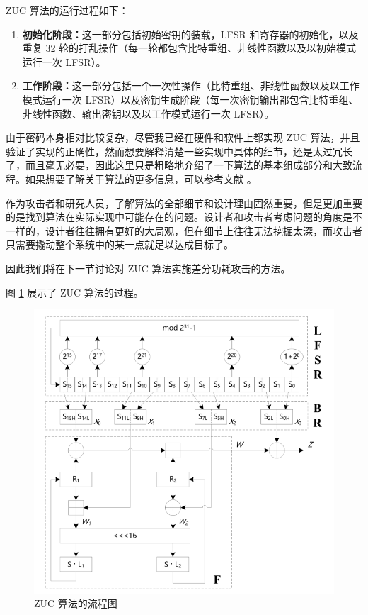 \vspace*{0.5\baselineskip}

ZUC 算法的运行过程如下：\cite{zuc_standard}

\begin{enumerate}
    \item \textbf{初始化阶段：}这一部分包括初始密钥的装载，LFSR 和寄存器的初始化，以及重复 32 轮的打乱操作（每一轮都包含比特重组、非线性函数以及以初始模式运行一次 LFSR）。
    \item \textbf{工作阶段：}这一部分包括一个一次性操作（比特重组、非线性函数以及以工作模式运行一次 LFSR）以及密钥生成阶段（每一次密钥输出都包含比特重组、非线性函数、输出密钥以及以工作模式运行一次 LFSR）。
\end{enumerate}

\vspace*{0.5\baselineskip}

由于密码本身相对比较复杂，尽管我已经在硬件和软件上都实现 ZUC 算法，并且验证了实现的正确性，然而想要解释清楚一些实现中具体的细节，还是太过冗长了，而且毫无必要，因此这里只是粗略地介绍了一下算法的基本组成部分和大致流程。如果想要了解关于算法的更多信息，可以参考文献 \parencite{zuc_standard}。

作为攻击者和研究人员，了解算法的全部细节和设计理由固然重要，但是更加重要的是找到算法在实际实现中可能存在的问题。设计者和攻击者考虑问题的角度是不一样的，设计者往往拥有更好的大局观，但在细节上往往无法挖掘太深，而攻击者只需要撬动整个系统中的某一点就足以达成目标了。

因此我们将在下一节讨论对 ZUC 算法实施差分功耗攻击的方法。

\vspace*{0.5\baselineskip}

图 \ref{fig:zuc_algo} 展示了 ZUC 算法的过程。

\begin{figure}[htbp]
    \centering
    \includegraphics[height=.5\textheight]{../images/zuc_algo.png}
    \caption{ZUC 算法的流程图 \cite{zuc_standard}}
    \label{fig:zuc_algo}
\end{figure}


